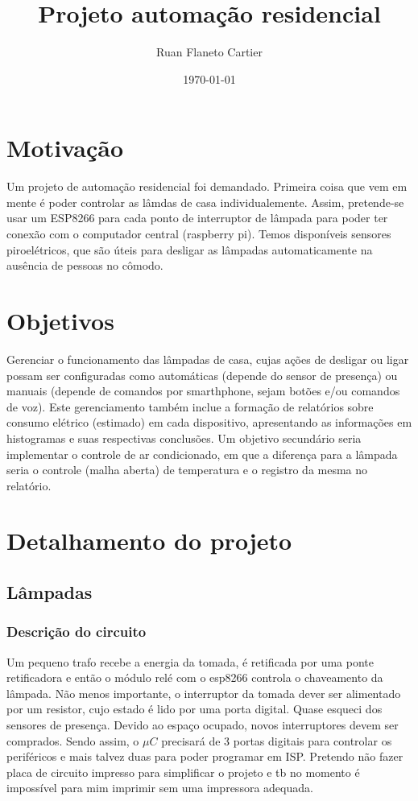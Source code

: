\documentclass[11pt]{article}
\author{Ruan Flaneto Cartier}
\date{\today}
\title{Projeto automação residencial}
\begin{document}
\maketitle
\tableofcontents


\section{Motivação}
\label{sec:orga999f0f}
Um projeto de automação residencial foi demandado. Primeira coisa que vem em mente é poder controlar as lâmdas de casa individualemente. Assim, pretende-se usar um ESP8266 para cada ponto de interruptor de lâmpada para poder ter conexão com o computador central (raspberry pi). Temos disponíveis sensores piroelétricos, que são úteis para desligar as lâmpadas automaticamente na ausência de pessoas no cômodo.

\section{Objetivos}
\label{sec:org3b42ab0}
Gerenciar o funcionamento das lâmpadas de casa, cujas ações de desligar ou ligar possam ser configuradas como automáticas (depende do sensor de presença) ou manuais (depende de comandos por smarthphone, sejam botões e/ou comandos de voz). Este gerenciamento também inclue a formação de relatórios sobre consumo elétrico (estimado) em cada dispositivo, apresentando as informações em histogramas e suas respectivas conclusões.
Um objetivo secundário seria implementar o controle de ar condicionado, em que a diferença para a lâmpada seria o controle (malha aberta) de temperatura e o registro da mesma no relatório.

\section{Detalhamento do projeto}
\label{sec:org32e8f7b}
\subsection{Lâmpadas}
\label{sec:orgfd36e63}
\subsubsection{Descrição do circuito}
\label{sec:org582a93b}
Um pequeno trafo recebe a energia da tomada, é retificada por uma ponte retificadora e então o módulo relé com o esp8266 controla o chaveamento da lâmpada. Não menos importante, o interruptor da tomada dever ser alimentado por um resistor, cujo estado é lido por uma porta digital. Quase esqueci dos sensores de presença. Devido ao espaço ocupado, novos interruptores devem ser comprados.
Sendo assim, o \(\mu C\) precisará de 3 portas digitais para controlar os periféricos e mais talvez duas para poder programar em ISP.
Pretendo não fazer placa de circuito impresso para simplificar o projeto e tb no momento é impossível para mim imprimir sem uma impressora adequada.
\end{document}

